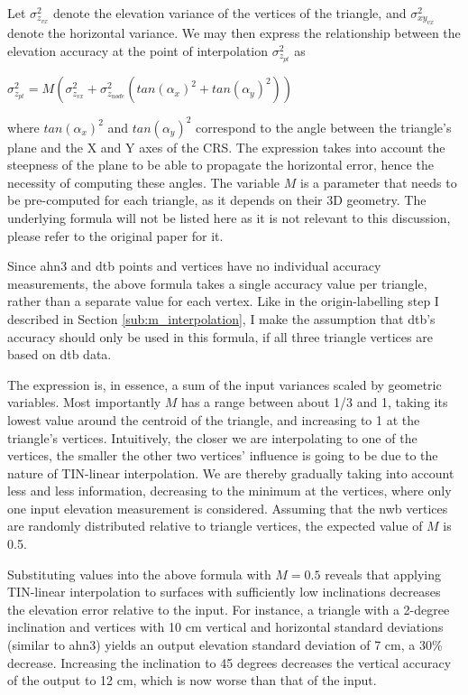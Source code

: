 Let $\sigma_{z_{vx}}^{2}$ denote the elevation variance of the vertices of the triangle, and $\sigma_{xy_{vx}}^{2}$ denote the horizontal variance. We may then express the relationship between the elevation accuracy at the point of interpolation $\sigma_{z_{pt}}^{2}$ as

$\sigma_{z_{pt}}^{2} = M\left(\sigma_{z_{vx}}^{2} + \sigma_{z_{node}}^{2}\left(tan\left(\alpha_x\right)^2 + tan\left(\alpha_y\right)^2\right)\right)$

where $tan\left(\alpha_x\right)^2$ and $tan\left(\alpha_y\right)^2$ correspond to the angle between the triangle's plane and the X and Y axes of the CRS. The expression takes into account the steepness of the plane to be able to propagate the horizontal error, hence the necessity of computing these angles. The variable $M$ is a parameter that needs to be pre-computed for each triangle, as it depends on their 3D geometry. The underlying formula will not be listed here as it is not relevant to this discussion, please refer to the original paper for it.

Since \ac{ahn3} and \ac{dtb} points and vertices have no individual accuracy measurements, the above formula takes a single accuracy value per triangle, rather than a separate value for each vertex. Like in the origin-labelling step I described in Section \ref{sub:m_interpolation}, I make the assumption that \ac{dtb}'s accuracy should only be used in this formula, if all three triangle vertices are based on \ac{dtb} data.

The expression is, in essence, a sum of the input variances scaled by geometric variables. Most importantly $M$ has a range between about 1/3 and 1, taking its lowest value around the centroid of the triangle, and increasing to 1 at the triangle's vertices. Intuitively, the closer we are interpolating to one of the vertices, the smaller the other two vertices' influence is going to be due to the nature of TIN-linear interpolation. We are thereby gradually taking into account less and less information, decreasing to the minimum at the vertices, where only one input elevation measurement is considered. Assuming that the \ac{nwb} vertices are randomly distributed relative to triangle vertices, the expected value of $M$ is 0.5.

Substituting values into the above formula with $M=0.5$ reveals that applying TIN-linear interpolation to surfaces with sufficiently low inclinations decreases the elevation error relative to the input. For instance, a triangle with a 2-degree inclination and vertices with 10 cm vertical and horizontal standard deviations (similar to \ac{ahn3}) yields an output elevation standard deviation of 7 cm, a 30\% decrease. Increasing the inclination to 45 degrees decreases the vertical accuracy of the output to 12 cm, which is now worse than that of the input.

